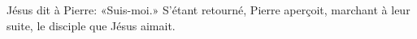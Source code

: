 \encetemps Jésus dit à Pierre:
	«Suis-moi.»
S’étant retourné, Pierre aperçoit, marchant à leur suite,
	le disciple que Jésus aimait.
